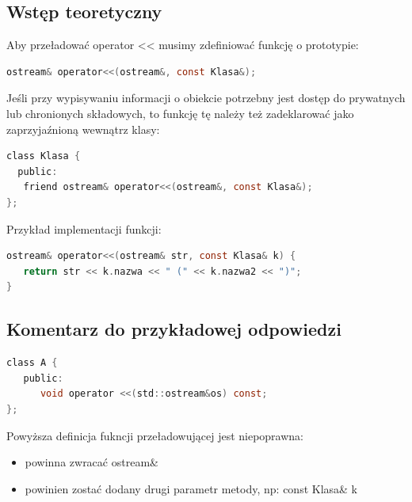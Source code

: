 \subsection{Wstęp teoretyczny}
Aby przeładować operator << musimy zdefiniować funkcję o prototypie: 
\begin{lstlisting}[language=c]
ostream& operator<<(ostream&, const Klasa&);
\end{lstlisting}
Jeśli przy wypisywaniu informacji o obiekcie potrzebny jest dostęp do prywatnych lub chronionych składowych, to funkcję tę należy też zadeklarować jako zaprzyjaźnioną wewnątrz klasy:
\begin{lstlisting}[language=c]
class Klasa {
  public:
   friend ostream& operator<<(ostream&, const Klasa&);
};
\end{lstlisting}
Przykład implementacji funkcji:
\begin{lstlisting}[language=c]
ostream& operator<<(ostream& str, const Klasa& k) {
   return str << k.nazwa << " (" << k.nazwa2 << ")";
}
\end{lstlisting}

\subsection{Komentarz do przykładowej odpowiedzi}
\begin{lstlisting}[language=c]
class A {
   public:
      void operator <<(std::ostream&os) const; 
};
\end{lstlisting}
Powyższa definicja fukncji przeładowującej jest niepoprawna:
\begin{itemize}
\item powinna zwracać ostream\&
\item powinien zostać dodany drugi parametr metody, np: const Klasa\& k 
\end{itemize}
